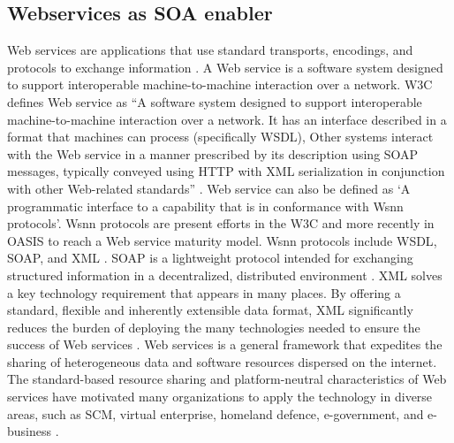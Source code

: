 \documentclass[12pt,a4paper,final,twoside,onecolumn,titlepage]{book}
\begin{document}
\subsection{Webservices as SOA enabler}
Web services are applications that use standard transports, encodings, and protocols to exchange information \cite{R52}. A Web service is a software system designed to support interoperable machine-to-machine interaction over a network. \gls{W3C} defines Web service as “A software system designed to support interoperable machine-to-machine interaction over a network. It has an interface described in a format that machines can process (specifically \gls{WSDL}), Other systems interact with the Web service in a manner prescribed by its description using \gls{SOAP} messages, typically conveyed using \gls{HTTP} with \gls{XML} serialization in conjunction with other Web-related standards” \cite{R53}. Web service can also be defined as ‘A programmatic interface to a capability that is in conformance with Wsnn protocols’. Wsnn protocols are present efforts in the \gls{W3C} and more recently in OASIS to reach a Web service maturity model. Wsnn protocols include \gls{WSDL}, \gls{SOAP}, and \gls{XML} \cite{R54}. \gls{SOAP} is a lightweight protocol intended for exchanging structured information in a decentralized, distributed environment \cite{R55}. \gls{XML} solves a key technology requirement that appears in many places. By offering a standard, flexible and inherently extensible data format, \gls{XML} significantly reduces the burden of deploying the many technologies needed to ensure the success of Web services \cite{R56}. Web services is a general framework that expedites the sharing of heterogeneous data and software resources dispersed on the internet. The standard-based resource sharing and platform-neutral characteristics of Web services have motivated many organizations to apply the technology in diverse areas, such as \gls{SCM}, virtual enterprise, homeland defence, e-government, and e-business \cite{R57}.
\end{document}
